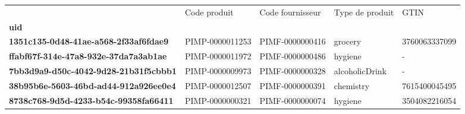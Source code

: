 \begin{tabularx}{\linewidth}{lXXXX}
\toprule
{} &     Code produit & Code fournisseur & Type de produit &           GTIN \\
\textbf{uid                                 } &                  &                  &                 &                \\
\midrule
\textbf{1351c135-0d48-41ae-a568-2f33af6fdae9} &  PIMP-0000011253 &  PIMF-0000000416 &         grocery &  3760063337099 \\
\textbf{ffabf67f-314e-47a8-932e-37da7a3ab1ae} &  PIMP-0000011972 &  PIMF-0000000486 &         hygiene &              - \\
\textbf{7bb3d9a9-d50c-4042-9d28-21b31f5cbbb1} &  PIMP-0000009973 &  PIMF-0000000328 &  alcoholicDrink &              - \\
\textbf{38b95b6e-5603-46bd-ad44-912a926ee0e4} &  PIMP-0000012507 &  PIMF-0000000391 &       chemistry &  7615400045495 \\
\textbf{8738c768-9d5d-4233-b54c-99358fa66411} &  PIMP-0000000321 &  PIMF-0000000074 &         hygiene &  3504082216054 \\
\bottomrule
\end{tabularx}
